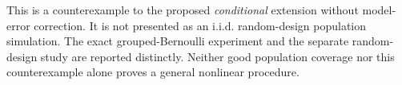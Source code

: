 This is a counterexample to the proposed \emph{conditional} extension without
model-error correction. It is not presented as an i.i.d. random-design
population simulation. The exact grouped-Bernoulli experiment and the separate
random-design study are reported distinctly. Neither good population coverage
nor this counterexample alone proves a general nonlinear procedure.

